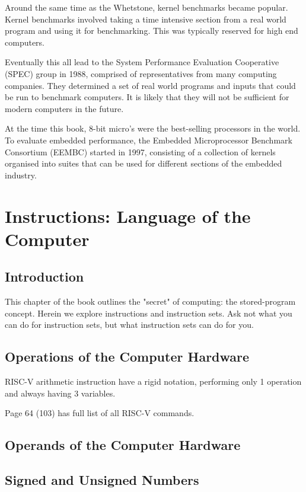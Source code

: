 \documentclass{article}
\begin{document}
{			Around the same time as the Whetstone, kernel benchmarks became popular. Kernel benchmarks involved taking a time intensive section from a real world program and using it for benchmarking. This was typically reserved for high end computers.
			
			Eventually this all lead to the System Performance Evaluation Cooperative (SPEC) group in 1988, comprised of representatives from many computing companies. They determined a set of real world programs and inputs that could be run to benchmark computers. It is likely that they will not be sufficient for modern computers in the future.
			
			At the time this book, 8-bit micro's were the best-selling processors in the world. To evaluate embedded performance, the Embedded Microprocessor Benchmark Consortium (EEMBC) started in 1997, consisting of a collection of kernels organised into suites that can be used for different sections of the embedded industry.
			
		\section{Instructions: Language of the Computer}
			\subsection{Introduction}
				This chapter of the book outlines the "secret" of computing: the stored-program concept. Herein we explore instructions and instruction sets. Ask not what you can do for instruction sets, but what instruction sets can do for you.
			\subsection{Operations of the Computer Hardware}
				RISC-V arithmetic instruction have a rigid notation, performing only 1 operation and always having 3 variables.
				
				Page 64 (103) has full list of all RISC-V commands.
			\subsection{Operands of the Computer Hardware}
			
			\subsection{Signed and Unsigned Numbers}
			
}
\end{document}
